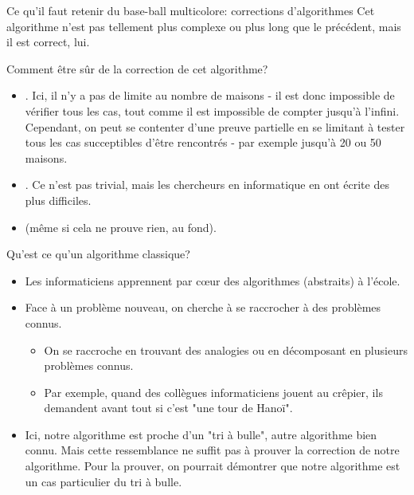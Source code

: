 \begin{frame}{Ce qu'il faut retenir du base-ball multicolore: corrections d'algorithmes}
  Cet algorithme n'est pas tellement plus complexe ou plus long que le
  précédent, mais il est correct, lui.

  \begin{block}{Comment être sûr de la \alert{correction} de cet algorithme?}
    \begin{itemize}
    \item {}. Ici, il n'y a pas de limite au nombre de maisons - il est donc impossible de vérifier tous les cas, tout comme il est impossible de compter jusqu'à l'infini. Cependant, on peut se contenter d'une preuve partielle en se limitant à tester tous les cas succeptibles d'être rencontrés - par exemple jusqu'à 20 ou 50 maisons.
    \item {}. Ce n'est pas trivial, mais les chercheurs en informatique en ont écrite des plus difficiles.
    \item {} (même
      si cela ne prouve rien, au fond).
    \end{itemize}
  \end{block}

  \begin{block}{Qu'est ce qu'un \alert{algorithme classique}?}
    \begin{itemize}
    \item Les informaticiens apprennent par cœur des algorithmes (abstraits) à l'école.
    \item Face à un problème nouveau, on cherche à se raccrocher à des problèmes connus.
      \begin{itemize}
      \item On se raccroche en trouvant des analogies ou en décomposant en plusieurs problèmes connus.
      \item Par exemple, quand des collègues informaticiens jouent au crêpier, ils demandent avant tout si c'est "une tour de Hanoï".
      \end{itemize}
    \item Ici, notre algorithme est proche d'un "tri à bulle", autre algorithme bien connu. Mais cette ressemblance ne suffit pas à prouver la correction de notre algorithme. Pour la prouver, on pourrait démontrer que notre algorithme est un cas particulier du tri à bulle.
    \end{itemize}
  \end{block}


\end{frame}
